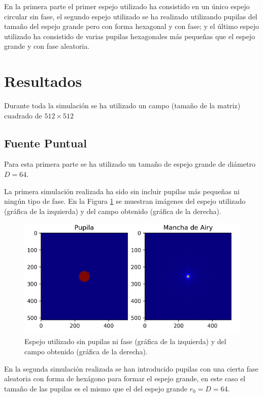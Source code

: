 \documentclass[twoside]{article}
\begin{document}
\begin{multicols}{2}
			En la primera parte el primer espejo utilizado ha consistido en un único espejo circular sin fase, el segundo espejo utilizado se ha realizado utilizando pupilas del tamaño del espejo grande pero con forma hexagonal y con fase; y el último espejo utilizado ha consistido de varias pupilas hexagonales más pequeñas que el espejo grande y con fase aleatoria.

		\section{Resultados}

			Durante toda la simulación se ha utilizado un campo (tamaño de la matriz) cuadrado de $512\times512$

			\subsection{Fuente Puntual}

				Para esta primera parte se ha utilizado un tamaño de espejo grande de diámetro $D = 64$.

				La primera simulación realizada ha sido sin incluir pupilas más pequeñas ni ningún tipo de fase. En la Figura \ref{Img:airy-normal} se muestran imágenes del espejo utilizado (gráfica de la izquierda) y del campo obtenido (gráfica de la derecha).

					\begin{figure}[H]
						\centering
						\includegraphics[scale=0.2]{Airy.png}
						\caption{\label{Img:airy-normal}Espejo utilizado sin pupilas ni fase (gráfica de la izquierda) y del campo obtenido (gráfica de la derecha).}
					\end{figure}

				En la segunda simulación realizada se han introducido pupilas con una cierta fase aleatoria con forma de hexágono para formar el espejo grande, en este caso el tamaño de las pupilas es el mismo que el del espejo grande $r_0 = D = 64$.


\end{multicols}
\end{document}
